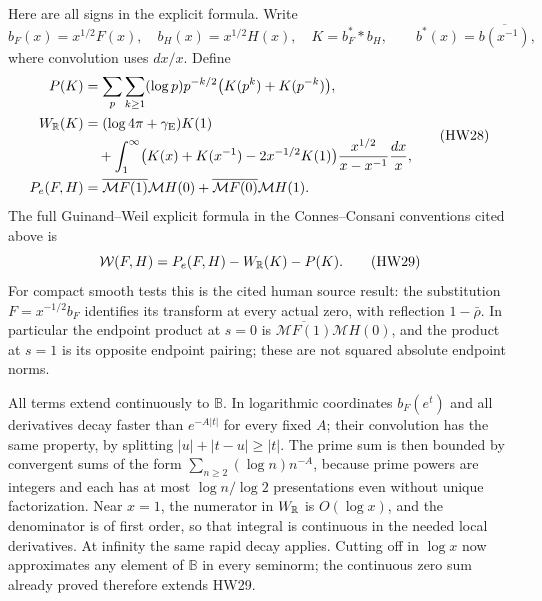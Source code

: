\documentclass[11pt,a4paper]{article}
\theoremstyle{definition}\newtheorem{definition}[theorem]{Definition}
\newcommand{\B}{\mathbb B}\newcommand{\N}{\mathbb N}
\providecommand{\M}{\mathcal M}
\begin{document}
Here are all signs in the explicit formula. Write
\[
 b_F(x)=x^{1/2}F(x),\quad b_H(x)=x^{1/2}H(x),\quad
 K=b_F^**b_H,\qquad b^*(x)=\overline{b(x^{-1})},
 \tag{HW27}
\]
where convolution uses \(dx/x\). Define
\[
 \begin{split}
 P(K)&=\sum_{p}\sum_{k\ge1}(\log p)p^{-k/2}
                          \bigl(K(p^k)+K(p^{-k})\bigr),\\
 W_\R(K)&=(\log4\pi+\gamma_{\rm E})K(1)\\
 &\quad+\int_1^\infty
  \bigl(K(x)+K(x^{-1})-2x^{-1/2}K(1)\bigr)
               \frac{x^{1/2}}{x-x^{-1}}\frac{dx}{x},\\
 P_e(F,H)&=\overline{\M F(1)}\M H(0)
                         +\overline{\M F(0)}\M H(1).
 \end{split}
 \tag{HW28}\label{hw:localterms}
\]
The full Guinand--Weil explicit formula in the Connes--Consani
conventions cited above is
\[
 \mathcal W(F,H)=P_e(F,H)-W_\mathbb R(K)-P(K).
 \tag{HW29}\label{hw:explicit}
\]
For compact smooth tests this is the cited human source result:
the substitution \(F=x^{-1/2}b_F\) identifies its transform
at every actual zero, with reflection \(1-\bar\rho\).
In particular the endpoint product at \(s=0\) is
\(\overline{\M F(1)}\M H(0)\), and the product at \(s=1\)
is its opposite endpoint pairing; these are not squared
absolute endpoint norms.

All terms extend continuously to \(\B\).
In logarithmic coordinates \(b_F(e^t)\) and all derivatives
decay faster than \(e^{-A|t|}\) for every fixed \(A\);
their convolution has the same property, by splitting
\(|u|+|t-u|\ge |t|\).
The prime sum is then bounded by convergent sums of the form
\(\sum_{n\ge2}(\log n)n^{-A}\), because prime powers are
integers and each has at most \(\log n/\log2\) presentations
even without unique factorization. Near \(x=1\), the numerator
in \(W_\mathbb R\) is \(O(\log x)\), and the denominator is of
first order, so that integral is continuous in the needed
local derivatives. At infinity the same rapid decay applies.
Cutting off in \(\log x\) now approximates any element of
\(\B\) in every seminorm; the continuous zero sum already
proved therefore extends HW29.
\end{document}
